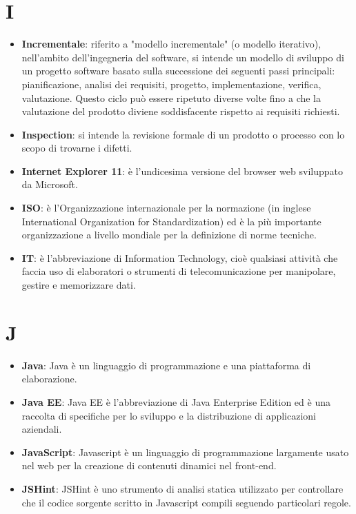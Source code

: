\documentclass[a4paper, oneside, openany, dvipsnames, table]{article}
\begin{document}
\section{I}
\begin{itemize}
\item \textbf{Incrementale}: riferito a "modello incrementale" (o modello iterativo), nell'ambito dell'ingegneria del software, si intende un modello di sviluppo di un progetto software basato sulla successione dei seguenti passi principali: pianificazione, analisi dei requisiti, progetto, implementazione, verifica, valutazione. Questo ciclo può essere ripetuto diverse volte fino a che la valutazione del prodotto diviene soddisfacente rispetto ai requisiti richiesti.
\item \textbf{Inspection}: si intende la revisione formale di un prodotto o processo con lo scopo di trovarne i difetti.
\item \textbf{Internet Explorer 11}: è l'undicesima versione del browser web sviluppato da Microsoft.
\item \textbf{ISO}: è l'Organizzazione internazionale per la normazione (in inglese International Organization for Standardization) ed è la più importante organizzazione a livello mondiale per la definizione di norme tecniche.
\item \textbf{IT}: è l'abbreviazione di Information Technology, cioè qualsiasi attività che faccia uso di elaboratori o strumenti di telecomunicazione per manipolare, gestire e memorizzare dati.

\end{itemize}

\section{J}
\begin{itemize}
\item \textbf{Java}: Java è un linguaggio di programmazione e una piattaforma di elaborazione.
\item \textbf{Java EE}: Java EE è l'abbreviazione di Java Enterprise Edition ed è una raccolta di specifiche per lo sviluppo e la distribuzione di applicazioni aziendali.	
\item \textbf{JavaScript}: Javascript è un linguaggio di programmazione largamente usato nel web per la creazione di contenuti dinamici nel front-end. 
\item \textbf{JSHint}: JSHint è uno strumento di analisi statica utilizzato per controllare che il codice sorgente scritto in Javascript compili seguendo particolari regole.
\end{itemize}
\end{document}
